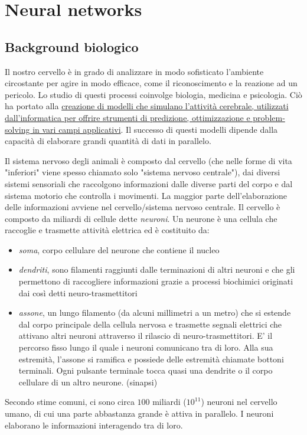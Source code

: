 \section{Neural networks}
\subsection{Background biologico}
Il nostro cervello è in grado di analizzare in modo sofisticato l'ambiente circostante per agire in modo efficace, come il riconoscimento e la reazione ad un pericolo. Lo studio di questi processi coinvolge biologia, medicina e psicologia. Ciò ha portato alla \uline{creazione di modelli che simulano l'attività cerebrale, utilizzati dall'informatica per offrire strumenti di predizione, ottimizzazione e problem-solving in vari campi applicativi}. Il successo di questi modelli dipende dalla capacità di elaborare grandi quantità di dati in parallelo.

Il sistema nervoso degli animali è composto dal cervello (che nelle forme di vita "inferiori" viene spesso chiamato solo "sistema nervoso centrale"), dai diversi sistemi sensoriali che raccolgono informazioni dalle diverse parti del corpo e dal sistema motorio che controlla i movimenti. La maggior parte dell'elaborazione delle informazioni avviene nel cervello/sistema nervoso centrale. Il cervello è composto da miliardi di cellule dette \textit{neuroni}.
Un neurone è una cellula che raccoglie e trasmette attività elettrica ed è costituito da:
\begin{itemize}
    \item \textit{soma}, corpo cellulare del neurone che contiene il nucleo
    \item \textit{dendriti}, sono filamenti raggiunti dalle terminazioni di altri neuroni e che gli permettono di raccogliere informazioni grazie a processi biochimici originati dai così detti neuro-trasmettitori
    \item \textit{assone}, un lungo filamento (da alcuni millimetri a un metro) che si estende dal corpo principale della cellula nervosa e trasmette segnali elettrici che attivano altri neuroni attraverso il rilascio di neuro-trasmettitori. E' il percorso fisso lungo il quale i neuroni comunicano tra di loro. Alla sua estremità, l'assone si ramifica e possiede delle estremità chiamate bottoni terminali. Ogni pulsante terminale tocca quasi una dendrite o il corpo cellulare di un altro neurone. (sinapsi)
\end{itemize}
Secondo stime comuni, ci sono circa $100$ miliardi ($10^{11}$) neuroni nel cervello umano, di cui una parte abbastanza grande è attiva in parallelo. I neuroni elaborano le informazioni interagendo tra di loro.

